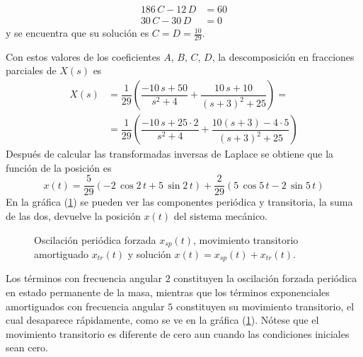 \begin{align*}
186 \, C - 12 \, D &= 60 \\
30 \, C - 30 \, D &= 0
\end{align*}
y se encuentra que su solución es $C = D = \frac{10}{29}$.
\par
Con estos valores de los coeficientes $A$, $B$, $C$, $D$, la descomposición en fracciones parciales de $X(s)$ es
\begin{align*}
X(s) &= \dfrac{1}{29} \left( \dfrac{-10 \, s + 50}{s^{2} + 4} + \dfrac{10 \, s + 10}{(s + 3)^{2} + 25} \right) = \\
&= \dfrac{1}{29} \left( \dfrac{-10 \, s + 25 \cdot 2}{s^{2} + 4} + \dfrac{10 (s+3) - 4 \cdot 5}{(s+3)^{2} + 25} \right)
\end{align*}
Después de calcular las transformadas inversas de Laplace se obtiene que la función de la posición es
\[ x(t) = \dfrac{5}{29} ( - 2 \, \cos 2 \, t  + 5 \, \sin 2 \, t ) + \dfrac{2}{29} (5 \, \cos 5 \, t - 2 \, \sin 5 \, t) \]
En la gráfica (\ref{fig:figura_010}) se pueden ver las componentes periódica y transitoria, la suma de las dos, devuelve la posición $x(t)$ del sistema mecánico.
\begin{figure}[H]
    \centering
    
    \caption{Oscilación periódica forzada $x_{sp}(t)$, movimiento transitorio amortiguado $x_{tr}(t)$ y solución $x(t) =x_{sp}(t) + x_{tr}(t)$.}
    \label{fig:figura_010}
\end{figure}
Los términos con frecuencia angular $2$ constituyen la oscilación forzada periódica en estado permanente de la masa, mientras que los términos exponenciales amortiguados con frecuencia angular $5$ constituyen su movimiento transitorio, el cual desaparece rápidamente, como se ve en la gráfica (\ref{fig:figura_010}). Nótese que el movimiento transitorio es diferente de cero aun cuando las condiciones iniciales sean cero.
